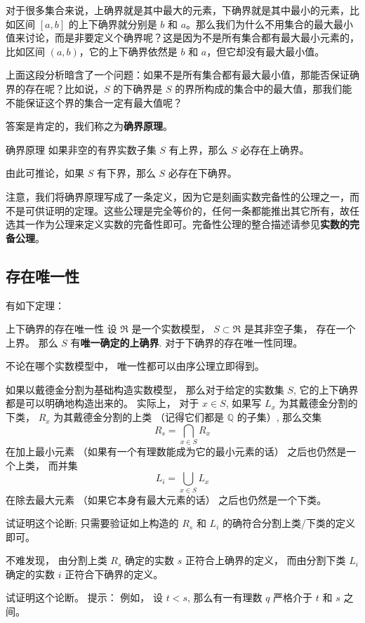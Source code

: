 对于很多集合来说，上确界就是其中最大的元素，下确界就是其中最小的元素，比如区间 $[a, b]$ 的上下确界就分别是 $b$ 和 $a$。那么我们为什么不用集合的最大最小值来讨论，而是非要定义个确界呢？这是因为不是所有集合都有最大最小元素的，比如区间 $(a, b)$，它的上下确界依然是 $b$ 和 $a$，但它却没有最大最小值。

上面这段分析暗含了一个问题：如果不是所有集合都有最大最小值，那能否保证确界的存在呢？比如说，$S$ 的下确界是 $S$ 的界所构成的集合中的最大值，那我们能不能保证这个界的集合一定有最大值呢？

答案是肯定的，我们称之为\textbf{确界原理}。

\begin{definition}{确界原理}\label{def_SupInf_3}
如果非空的有界实数子集 $S$ 有上界，那么 $S$ 必存在上确界。

由此可推论，如果 $S$ 有下界，那么 $S$ 必存在下确界。
\end{definition}

注意，我们将确界原理写成了一条定义，因为它是刻画实数完备性的公理之一，而不是可供证明的定理。这些公理是完全等价的，任何一条都能推出其它所有，故任选其一作为公理来定义实数的完备性即可。完备性公理的整合描述请参见\textbf{实数的完备公理}。

\subsection{存在唯一性}
有如下定理：

\begin{theorem}{上下确界的存在唯一性}
设 $\mathfrak{R}$ 是一个实数模型， $S\subset\mathfrak{R}$ 是其非空子集， 存在一个上界。 那么 $S$ 有\textbf{唯一确定的上确界}. 对于下确界的存在唯一性同理。
\end{theorem}

不论在哪个实数模型中， 唯一性都可以由序公理立即得到。

如果以戴德金分割为基础构造实数模型， 那么对于给定的实数集 $S$, 它的上下确界都是可以明确地构造出来的。 实际上， 对于 $x\in S$, 如果写 $L_x$ 为其戴德金分割的下类， $R_x$ 为其戴德金分割的上类 （记得它们都是 $\mathbb{Q}$ 的子集）, 那么交集
$$
R_s=\bigcap_{x\in S}R_x
$$
在加上最小元素 （如果有一个有理数能成为它的最小元素的话） 之后也仍然是一个上类， 而并集
$$
L_i=\bigcup_{x\in S}L_x
$$
在除去最大元素 （如果它本身有最大元素的话） 之后也仍然是一个下类。

\begin{exercise}{}
试证明这个论断; 只需要验证如上构造的 $R_s$ 和 $L_i$ 的确符合分割上类/下类的定义即可。
\end{exercise}

不难发现， 由分割上类 $R_s$ 确定的实数 $s$ 正符合上确界的定义， 而由分割下类 $L_i$ 确定的实数 $i$ 正符合下确界的定义。

\begin{exercise}{}
试证明这个论断。 提示： 例如， 设 $t<s$, 那么有一有理数 $q$ 严格介于 $t$ 和 $s$ 之间。 
\end{exercise}